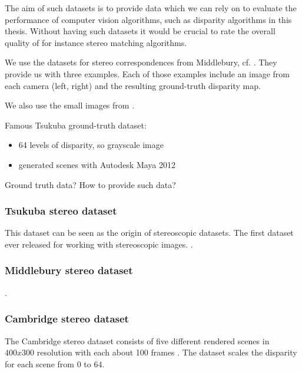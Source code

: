 The aim of such datasets is to provide data which we can rely on to evaluate the performance of computer vision algorithms, such as disparity algorithms in this thesis.
 Without having such datasets it would be crucial to rate the overall quality of for instance stereo matching algorithms.

We use the datasets for stereo correspondences from Middlebury, cf.  \citep{scharstein2014high}. They provide us with three examples. Each of those examples include an image from each camera (left, right) and the resulting ground-truth disparity map.

We also use the small images from \citep{martull2012realistic}.

Famous Tsukuba ground-truth dataset:

\begin{itemize}
  \item 64 levels of disparity, so grayscale image
  \item generated scenes with Autodesk Maya 2012
\end{itemize}

\citep{martull2012realistic}

Ground truth data? How to provide such data?


\subsubsection{Tsukuba stereo dataset}

This dataset can be seen as the origin of stereoscopic datasets.
The first dataset ever released for working with stereoscopic images.
\citep{martull2012realistic}.


\subsubsection{Middlebury stereo dataset}

\citep{scharstein2014high}.


\subsubsection{Cambridge stereo dataset}

The Cambridge stereo dataset consists of five different rendered scenes in $400x300$ resolution with each about 100 frames \citep{richardt2010real}.
The dataset scales the disparity for each scene from $0$ to $64$.

